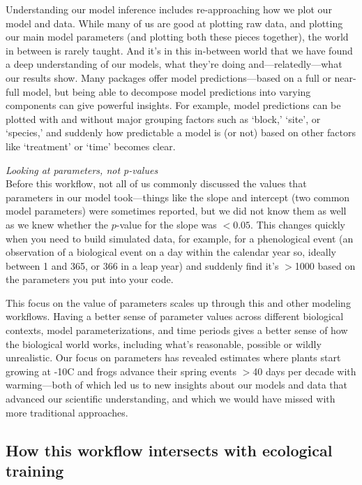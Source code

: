 \documentclass[11pt]{article}
\begin{document}
Understanding our model inference includes re-approaching how we plot our model and data. While many of us are good at plotting raw data, and plotting our main model parameters (and plotting both these pieces together), the world in between is rarely taught. And it's in this in-between world that we have found a deep understanding of our models, what they're doing and---relatedly---what our results show. Many packages offer model predictions---based on a full or near-full model, but being able to decompose model predictions into varying components can give powerful insights. For example, model predictions can be plotted with and without major grouping factors such as `block,' `site', or `species,' and suddenly how predictable a model is (or not) based on other factors like `treatment' or `time' becomes clear. 

 \emph{Looking at parameters, not p-values} \\
Before this workflow, not all of us commonly discussed the values that parameters in our model took---things like the slope and intercept (two common model parameters) were sometimes reported, but we did not know them as well as we knew whether the $p$-value for the slope was $<0.05$. This changes quickly when you need to build simulated data, for example, for a phenological event (an observation of a biological event on a day within the calendar year so, ideally between 1 and 365, or 366 in a leap year) and suddenly find it's $>$1000 based on the parameters you put into your code. 

This focus on the value of parameters scales up through this and other modeling workflows. Having a better sense of parameter values across different biological contexts, model parameterizations, and time periods gives a better sense of how the biological world works, including what's reasonable, possible or wildly unrealistic. Our focus on parameters has revealed estimates where plants start growing at -10\degree C and frogs advance their spring events $>$40 days per decade with warming---both of which led us to new insights about our models and data that advanced our scientific understanding, and which we would have missed with more traditional approaches.  %

\subsection*{How this workflow intersects with ecological training} %
\end{document}
